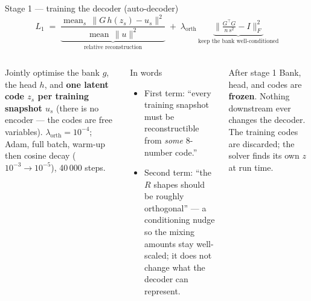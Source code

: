\documentclass[10pt,aspectratio=169]{beamer}
\newcommand{\T}{^{\top}}
\begin{document}
\begin{frame}{Stage 1 --- training the decoder (auto-decoder)}
  \[
    L_1 \;=\; \underbrace{\frac{\operatorname{mean}_s\,\|G\,h(z_s)-u_s\|^2}{\operatorname{mean}\,\|u\|^2}}_{\text{relative reconstruction}}
    \;+\; \lambda_{\mathrm{orth}}\,\underbrace{\Big\|\tfrac{G\T G}{n\,s^{2}}-I\Big\|_F^{2}}_{\text{keep the bank well-conditioned}}
  \]
  \footnotesize
  \begin{columns}[T]
    Jointly optimise the bank $g$, the head $h$, and \textbf{one latent code $z_s$ per training snapshot $u_s$}
    (there is no encoder --- the codes are free variables). $\lambda_{\mathrm{orth}}=10^{-4}$; Adam, full batch, warm-up then cosine decay ($10^{-3}\to10^{-5}$), 40\,000 steps.
    \begin{block}{In words}
      \begin{itemize}
        \item First term: ``every training snapshot must be reconstructible from \emph{some} 8-number code.''
        \item Second term: ``the $R$ shapes should be roughly orthogonal'' --- a conditioning nudge so the mixing amounts stay well-scaled; it does not change what the decoder can represent.
      \end{itemize}
    \end{block}
    \begin{alertblock}{After stage 1}
      Bank, head, and codes are \textbf{frozen}. Nothing downstream ever changes the decoder.
      The training codes are discarded; the solver finds its own $z$ at run time.
    \end{alertblock}
  \end{columns}
\end{frame}
\end{document}
